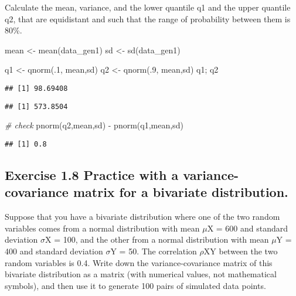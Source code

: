 \documentclass[
]{article}
\newenvironment{Shaded}{\begin{snugshade}}{\end{snugshade}}
\newcommand{\CommentTok}[1]{\textcolor[rgb]{0.56,0.35,0.01}{\textit{#1}}}
\newcommand{\DecValTok}[1]{\textcolor[rgb]{0.00,0.00,0.81}{#1}}
\newcommand{\FunctionTok}[1]{\textcolor[rgb]{0.00,0.00,0.00}{#1}}
\newcommand{\NormalTok}[1]{#1}
\newcommand{\OtherTok}[1]{\textcolor[rgb]{0.56,0.35,0.01}{#1}}
\newcommand{\SpecialCharTok}[1]{\textcolor[rgb]{0.00,0.00,0.00}{#1}}
\begin{document}
Calculate the mean, variance, and the lower quantile q1 and the upper
quantile q2, that are equidistant and such that the range of probability
between them is 80\%.

\begin{Shaded}
\begin{Highlighting}[]
\NormalTok{mean }\OtherTok{\textless{}{-}} \FunctionTok{mean}\NormalTok{(data\_gen1)}
\NormalTok{sd }\OtherTok{\textless{}{-}} \FunctionTok{sd}\NormalTok{(data\_gen1)}

\NormalTok{q1 }\OtherTok{\textless{}{-}} \FunctionTok{qnorm}\NormalTok{(.}\DecValTok{1}\NormalTok{,}
\NormalTok{            mean,sd)}
\NormalTok{q2 }\OtherTok{\textless{}{-}} \FunctionTok{qnorm}\NormalTok{(.}\DecValTok{9}\NormalTok{,}
\NormalTok{            mean,sd)}
\NormalTok{q1; q2}
\end{Highlighting}
\end{Shaded}

\begin{verbatim}
## [1] 98.69408
\end{verbatim}

\begin{verbatim}
## [1] 573.8504
\end{verbatim}

\begin{Shaded}
\begin{Highlighting}[]
\CommentTok{\# check}
\FunctionTok{pnorm}\NormalTok{(q2,mean,sd) }\SpecialCharTok{{-}} \FunctionTok{pnorm}\NormalTok{(q1,mean,sd)}
\end{Highlighting}
\end{Shaded}

\begin{verbatim}
## [1] 0.8
\end{verbatim}

\hypertarget{exercise-1.8-practice-with-a-variance-covariance-matrix-for-a-bivariate-distribution.}{%
\subsection{Exercise 1.8 Practice with a variance-covariance matrix for
a bivariate
distribution.}\label{exercise-1.8-practice-with-a-variance-covariance-matrix-for-a-bivariate-distribution.}}

Suppose that you have a bivariate distribution where one of the two
random variables comes from a normal distribution with mean \(\mu\)X =
600 and standard deviation \(\sigma\)X = 100, and the other from a
normal distribution with mean \(\mu\)Y = 400 and standard deviation
\(\sigma\)Y = 50. The correlation \(\rho\)XY between the two random
variables is 0.4. Write down the variance-covariance matrix of this
bivariate distribution as a matrix (with numerical values, not
mathematical symbols), and then use it to generate 100 pairs of
simulated data points.
\end{document}
